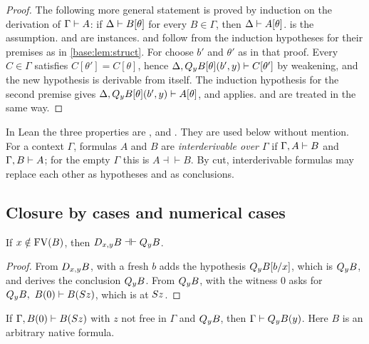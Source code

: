 \begin{proof}
The following more general statement is proved by induction on the
derivation of $\Gamma\vdash A$: if $\Delta\vdash B[\theta]$ for every
$B\in\Gamma$, then $\Delta\vdash A[\theta]$.   is the
assumption.   and  are instances.  
and  follow from the induction hypotheses for their premises as
in \cref{base:lem:struct}.  For  choose $b'$ and $\theta'$ as in
that proof.  Every $C\in\Gamma$ satisfies $C[\theta']=C[\theta]$, hence
$\Delta,Q_{y}B[\theta](b',y)\vdash C[\theta']$ by weakening, and the new
hypothesis is derivable from itself.  The induction hypothesis for the second
premise gives $\Delta,Q_{y}B[\theta](b',y)\vdash A[\theta]$, and
 applies.   and  are treated in the
same way.
\end{proof}

In Lean the three properties are ,  and
.  They are used below without mention.  For a context
$\Gamma$, formulas $A$ and $B$ are \emph{interderivable over $\Gamma$} if
$\Gamma,A\vdash B$ and $\Gamma,B\vdash A$; for the empty $\Gamma$ this is
$A\dashv\vdash B$.  By cut, interderivable formulas may replace each other
as hypotheses and as conclusions.

\subsection{Closure by cases and numerical cases}

\begin{lemma}
\label{base:lem:dummy}
If $x\notin\operatorname{FV}(B)$, then $D_{x,y}B\dashv\vdash Q_{y}B$.
\end{lemma}

\begin{proof}
From $D_{x,y}B$,  with a fresh $b$ adds the hypothesis
$Q_{y}B[b/x]$, which is $Q_{y}B$, and  derives the
conclusion $Q_{y}B$.  From $Q_{y}B$,  with the witness $0$ asks
for $Q_{y}B,\ B(0)\vdash B(S z)$, which is  at $S z$.
\end{proof}

\begin{lemma}
\label{base:lem:qI}
If $\Gamma,B(0)\vdash B(S z)$ with $z$ not free in $\Gamma$ and
$Q_{y}B$, then $\Gamma\vdash Q_{y}B(y)$.  Here $B$ is an arbitrary native
formula.
\end{lemma}

